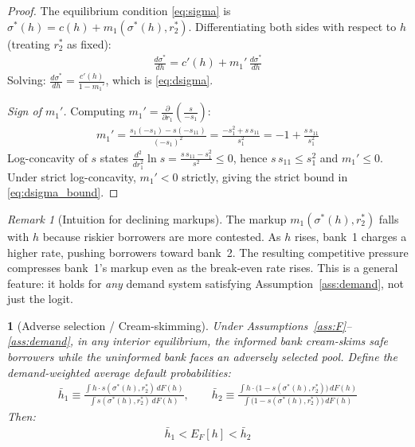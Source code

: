 \documentclass[12pt]{article}
\theoremstyle{plain}
\theoremstyle{plain}
\newtheorem{prop}[thm]{\protect\propositionname}
\theoremstyle{definition}  %
\theoremstyle{remark}  %
\newtheorem{remark}[thm]{Remark}  %
\providecommand{\propositionname}{Proposition}
\begin{document}
\begin{proof}
The equilibrium condition \eqref{eq:sigma} is $\sigma^*(h) = c(h) + m_1(\sigma^*(h), r_2^*)$. Differentiating both sides with respect to $h$ (treating $r_2^*$ as fixed):
\begin{align*}
    \frac{d\sigma^*}{dh} = c'(h) + m_1'\, \frac{d\sigma^*}{dh}
\end{align*}
Solving: $\frac{d\sigma^*}{dh} = \frac{c'(h)}{1 - m_1'}$, which is \eqref{eq:dsigma}.

\medskip\noindent
\emph{Sign of $m_1'$.} Computing $m_1' = \frac{\partial}{\partial r_1}\!\left(\frac{s}{-s_1}\right)$:
\begin{align*}
    m_1' = \frac{s_1(-s_1) - s(-s_{11})}{(-s_1)^2} = \frac{-s_1^2 + s\, s_{11}}{s_1^2} = -1 + \frac{s\, s_{11}}{s_1^2}
\end{align*}
Log-concavity of $s$ states $\frac{d^2}{dr_1^2}\ln s = \frac{s\, s_{11} - s_1^2}{s^2} \leq 0$, hence $s\, s_{11} \leq s_1^2$ and $m_1' \leq 0$. Under strict log-concavity, $m_1' < 0$ strictly, giving the strict bound in \eqref{eq:dsigma_bound}.
\end{proof}

\begin{remark}[Intuition for declining markups]\label{rem:intuition_mono}
The markup $m_1(\sigma^*(h), r_2^*)$ falls with $h$ because riskier borrowers are more contested. As $h$ rises, bank~1 charges a higher rate, pushing borrowers toward bank~2. The resulting competitive pressure compresses bank~1's markup even as the break-even rate rises. This is a general feature: it holds for \emph{any} demand system satisfying Assumption~\ref{ass:demand}, not just the logit.
\end{remark}


\begin{prop}[Adverse selection / Cream-skimming]\label{prop:adverse}
Under Assumptions~\ref{ass:F}--\ref{ass:demand}, in any interior equilibrium, the informed bank cream-skims safe borrowers while the uninformed bank faces an adversely selected pool. Define the demand-weighted average default probabilities:
\begin{align*}
    \bar{h}_1 \equiv \frac{\displaystyle\int h \cdot s(\sigma^*(h), r_2^*)\, dF(h)}{\displaystyle\int s(\sigma^*(h), r_2^*)\, dF(h)}, \qquad
    \bar{h}_2 \equiv \frac{\displaystyle\int h \cdot \big(1-s(\sigma^*(h), r_2^*)\big)\, dF(h)}{\displaystyle\int \big(1-s(\sigma^*(h), r_2^*)\big)\, dF(h)}
\end{align*}
Then:
\begin{align}\label{eq:adverse}
    \bar{h}_1 < E_F[h] < \bar{h}_2
\end{align}
\end{prop}
\end{document}
